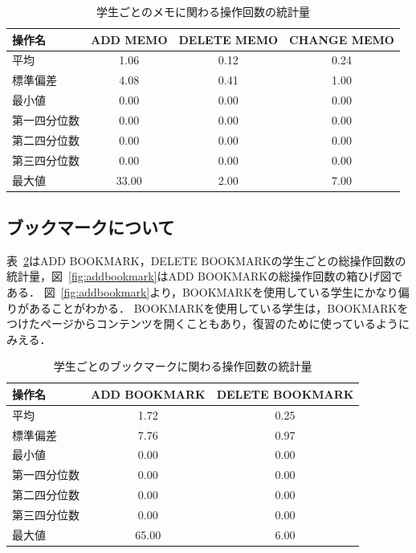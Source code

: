 \documentclass[a4paper,12pt]{ltjsreport}
\begin{document}
\begin{table}[tbp]
  \centering
  \caption{学生ごとのメモに関わる操作回数の統計量}
  \label{tb:memo}
  \begin{tabular}{l||c|c|c}
    操作名 & ADD MEMO & DELETE MEMO & CHANGE MEMO \\ \hline\hline
    平均 & 1.06 & 0.12 & 0.24 \\ \hline
    標準偏差 & 4.08 & 0.41 & 1.00 \\ \hline
    最小値 & 0.00 & 0.00 & 0.00 \\ \hline
    第一四分位数 & 0.00 & 0.00 & 0.00 \\ \hline
    第二四分位数 & 0.00 & 0.00 & 0.00 \\ \hline
    第三四分位数 & 0.00 & 0.00 & 0.00\\ \hline
    最大値 & 33.00 & 2.00 & 7.00 \\ \hline
  \end{tabular}
\end{table}

\subsection*{ブックマークについて}

表~\ref{tb:boookmark}はADD BOOKMARK，DELETE BOOKMARKの学生ごとの総操作回数の統計量，図~\ref{fig:addbookmark}はADD BOOKMARKの総操作回数の箱ひげ図である．
図~\ref{fig:addbookmark}より，BOOKMARKを使用している学生にかなり偏りがあることがわかる．
BOOKMARKを使用している学生は，BOOKMARKをつけたページからコンテンツを開くこともあり，復習のために使っているようにみえる．

\begin{table}[tbp]
  \centering
  \caption{学生ごとのブックマークに関わる操作回数の統計量}
  \label{tb:boookmark}
  \begin{tabular}{l||c|c}
    操作名 & ADD BOOKMARK & DELETE BOOKMARK \\ \hline\hline
    平均 & 1.72 & 0.25 \\ \hline
    標準偏差 & 7.76 & 0.97 \\ \hline
    最小値 & 0.00 & 0.00 \\ \hline
    第一四分位数 & 0.00 & 0.00 \\ \hline
    第二四分位数 & 0.00 & 0.00 \\ \hline
    第三四分位数 & 0.00 & 0.00 \\ \hline
    最大値 & 65.00 & 6.00 \\ \hline
  \end{tabular}
\end{table}
\end{document}
